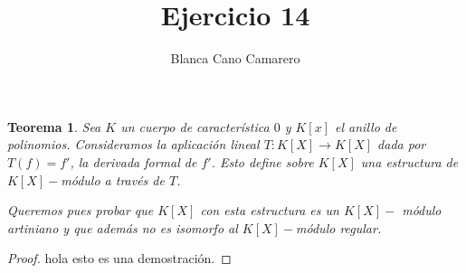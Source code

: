 \documentclass{article}
\title{Ejercicio 14}
\author{Blanca Cano Camarero}
\newtheorem*{teorema*}{Teorema}
\begin{document}
\maketitle

\begin{teorema*}
    Sea $K$ un cuerpo de característica $0$ y $K[x]$ el anillo de polinomios. Consideramos la aplicación lineal $T: K[X] \longrightarrow K[X]$ 
    dada por $T(f) = f'$, 
    la derivada formal de $f'$.
    Esto define sobre $K[X]$ una estructura de $K[X]-$módulo a través de $T$. 

    Queremos pues probar que $K[X]$ con esta estructura es un $K[X]-$ módulo artiniano y que además no es isomorfo al $K[X]-$módulo regular.
\end{teorema*}   

\begin{proof}
    hola esto es una demostración.
\end{proof}
\end{document}
